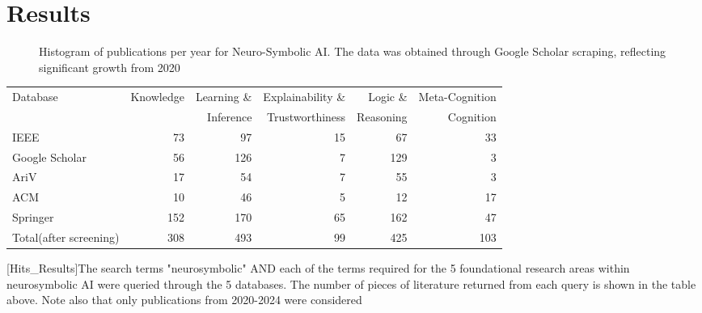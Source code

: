 \documentclass[hf]{ceurart}
\begin{document}
\section{Results}\label{sec:results}
\begin{figure}[ht]
    \centering
   
    \caption{Histogram of publications per year for Neuro-Symbolic AI. The data was obtained through Google Scholar scraping, reflecting significant growth from 2020}
    \label{fig:pubs_by_year}
\end{figure}


\begin{table*}[ht]
    \centering
    \begin{tabular}{lrrrrr}
        Database & Knowledge & Learning \& & Explainability \& & Logic \& & Meta-Cognition \\
         &  & Inference & Trustworthiness & Reasoning & Cognition \\
        \hline
        IEEE & 73 & 97 & 15 & 67 & 33  \\
        Google Scholar & 56 & 126 & 7 & 129 & 3  \\
        Ar\textnormal{\raisebox{0.5ex}{$\chi$}}iV & 17 & 54 & 7 & 55 & 3  \\
        ACM & 10 & 46 & 5 & 12 & 17  \\
        Springer & 152 & 170 & 65 & 162 & 47  \\
        Total(after screening)   & 308 & 493 & 99 & 425 & 103  \\
     \end{tabular}
     [Hits_Results]{The search terms "neurosymbolic" AND each of the terms required for the 5 foundational research areas within neurosymbolic AI were queried through the 5 databases. The number of pieces of literature returned from each query is shown in the table above. Note also that only publications from 2020-2024 were considered}
\label{tab::hits_2_results}
\end{table*}
\end{document}

